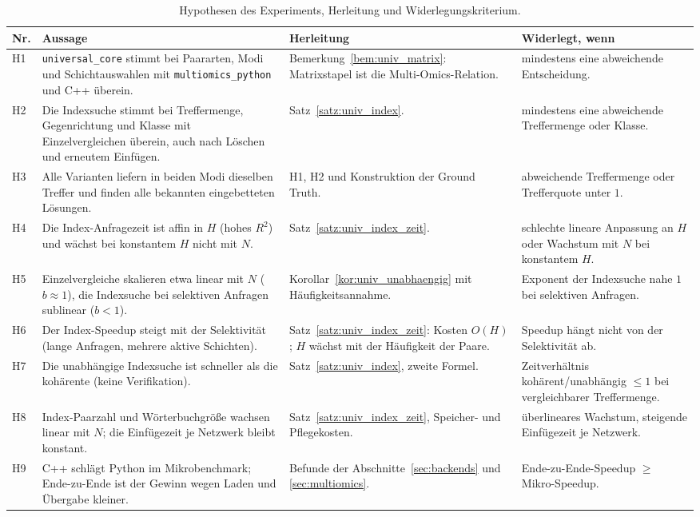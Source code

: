 \documentclass[a4paper,12pt, twoside]{report}
\theoremstyle{definition}
\begin{document}
\begin{table}[!ht]
	\centering
	\small
	\caption{Hypothesen des Experiments, Herleitung und Widerlegungskriterium.}
	\label{tab:ucx_hypothesen}
	\begin{tabular}{@{}>{\raggedright\arraybackslash}p{0.9cm}>{\raggedright\arraybackslash}p{5.6cm}>{\raggedright\arraybackslash}p{3.6cm}>{\raggedright\arraybackslash}p{4.2cm}@{}}
		\toprule
		Nr. & Aussage & Herleitung & Widerlegt, wenn \\
		\midrule
		H1 & \texttt{universal\_core} stimmt bei Paararten, Modi und Schichtauswahlen mit \texttt{multiomics\_python} und C++ überein. & Bemerkung~\ref{bem:univ_matrix}: Matrixstapel ist die Multi-Omics-Relation. & mindestens eine abweichende Entscheidung. \\
		H2 & Die Indexsuche stimmt bei Treffermenge, Gegenrichtung und Klasse mit Einzelvergleichen überein, auch nach Löschen und erneutem Einfügen. & Satz~\ref{satz:univ_index}. & mindestens eine abweichende Treffermenge oder Klasse. \\
		H3 & Alle Varianten liefern in beiden Modi dieselben Treffer und finden alle bekannten eingebetteten Lösungen. & H1, H2 und Konstruktion der Ground Truth. & abweichende Treffermenge oder Trefferquote unter $1$. \\
		H4 & Die Index-Anfragezeit ist affin in $H$ (hohes $R^2$) und wächst bei konstantem $H$ nicht mit $N$. & Satz~\ref{satz:univ_index_zeit}. & schlechte lineare Anpassung an $H$ oder Wachstum mit $N$ bei konstantem $H$. \\
		H5 & Einzelvergleiche skalieren etwa linear mit $N$ ($b\approx1$), die Indexsuche bei selektiven Anfragen sublinear ($b<1$). & Korollar~\ref{kor:univ_unabhaengig} mit Häufigkeitsannahme. & Exponent der Indexsuche nahe $1$ bei selektiven Anfragen. \\
		H6 & Der Index-Speedup steigt mit der Selektivität (lange Anfragen, mehrere aktive Schichten). & Satz~\ref{satz:univ_index_zeit}: Kosten $O(H)$; $H$ wächst mit der Häufigkeit der Paare. & Speedup hängt nicht von der Selektivität ab. \\
		H7 & Die unabhängige Indexsuche ist schneller als die kohärente (keine Verifikation). & Satz~\ref{satz:univ_index}, zweite Formel. & Zeitverhältnis kohärent/unabhängig $\le1$ bei vergleichbarer Treffermenge. \\
		H8 & Index-Paarzahl und Wörterbuchgröße wachsen linear mit $N$; die Einfügezeit je Netzwerk bleibt konstant. & Satz~\ref{satz:univ_index_zeit}, Speicher- und Pflegekosten. & überlineares Wachstum, steigende Einfügezeit je Netzwerk. \\
		H9 & C++ schlägt Python im Mikrobenchmark; Ende-zu-Ende ist der Gewinn wegen Laden und Übergabe kleiner. & Befunde der Abschnitte~\ref{sec:backends} und \ref{sec:multiomics}. & Ende-zu-Ende-Speedup $\ge$ Mikro-Speedup. \\
		\bottomrule
	\end{tabular}
\end{table}
\end{document}
